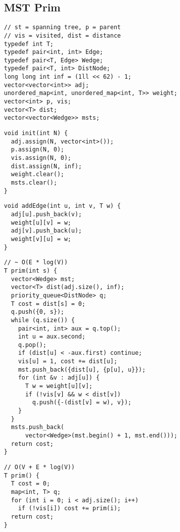 \documentclass[twoside]{article}
\begin{document}
\begin{multicols*}{2}
\subsection*{MST Prim}
\begin{verbatim}
// st = spanning tree, p = parent
// vis = visited, dist = distance
typedef int T;
typedef pair<int, int> Edge;
typedef pair<T, Edge> Wedge;
typedef pair<T, int> DistNode;
long long int inf = (1ll << 62) - 1;
vector<vector<int>> adj;
unordered_map<int, unordered_map<int, T>> weight;
vector<int> p, vis;
vector<T> dist;
vector<vector<Wedge>> msts;
\end{verbatim}
\vspace{-12pt}
\begin{verbatim}
void init(int N) {
  adj.assign(N, vector<int>());
  p.assign(N, 0);
  vis.assign(N, 0);
  dist.assign(N, inf);
  weight.clear();
  msts.clear();
}
\end{verbatim}
\vspace{-12pt}
\begin{verbatim}
void addEdge(int u, int v, T w) {
  adj[u].push_back(v);
  weight[u][v] = w;
  adj[v].push_back(u);
  weight[v][u] = w;
}
\end{verbatim}
\vspace{-12pt}
\begin{verbatim}
// ~ O(E * log(V))
T prim(int s) {
  vector<Wedge> mst;
  vector<T> dist(adj.size(), inf);
  priority_queue<DistNode> q;
  T cost = dist[s] = 0;
  q.push({0, s});
  while (q.size()) {
    pair<int, int> aux = q.top();
    int u = aux.second;
    q.pop();
    if (dist[u] < -aux.first) continue;
    vis[u] = 1, cost += dist[u];
    mst.push_back({dist[u], {p[u], u}});
    for (int &v : adj[u]) {
      T w = weight[u][v];
      if (!vis[v] && w < dist[v])
        q.push({-(dist[v] = w), v});
    }
  }
  msts.push_back(
      vector<Wedge>(mst.begin() + 1, mst.end()));
  return cost;
}
\end{verbatim}
\vspace{-12pt}
\begin{verbatim}
// O(V + E * log(V))
T prim() {
  T cost = 0;
  map<int, T> q;
  for (int i = 0; i < adj.size(); i++)
    if (!vis[i]) cost += prim(i);
  return cost;
}
\end{verbatim}

\subsectionfont{\large\bfseries\sffamily\underline}

\end{multicols*}
\end{document}

